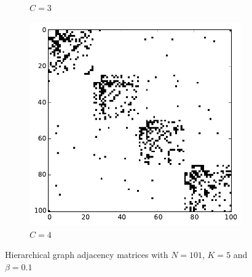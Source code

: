\begin{figure}[h]
\begin{subfigure}[b]{0.3\textwidth}
                \caption{$C=3$}
        \end{subfigure}
        \begin{subfigure}[b]{0.3\textwidth}
        	\centering
                \includegraphics[width=\textwidth]{images/topology/hierarchical_adjacency_4_dot1.pdf}
                \caption{$C=4$}
        \end{subfigure}
        \caption{Hierarchical graph adjacency matrices with $N=101$, $K=5$ and $\beta =0.1$}
        \label{fig:hierarchical adjacency graph 0.1}
\end{figure}


